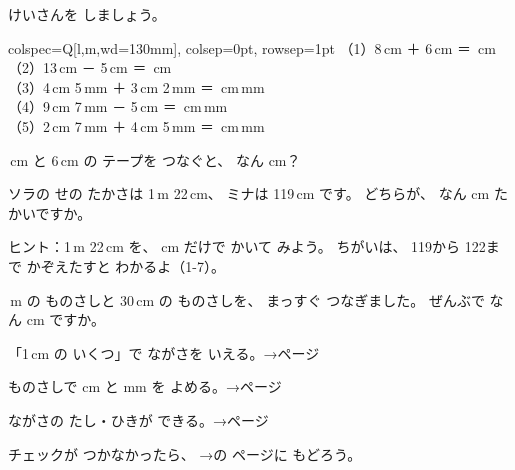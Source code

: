\bkproblem けいさんを しましょう。
\par
\noindent\hspace*{1\zw}\begin{tblr}{colspec={Q[l,m,wd=130mm]}, colsep=0pt, rowsep=1pt}
（1）8\,cm ＋ 6\,cm ＝ \bkkakikomi[13mm]\,cm \\
（2）13\,cm － 5\,cm ＝ \bkkakikomi[13mm]\,cm \\
（3）4\,cm 5\,mm ＋ 3\,cm 2\,mm ＝ \bkkakikomi\,cm\enspace\bkkakikomi\,mm \\
（4）9\,cm 7\,mm － 5\,cm ＝ \bkkakikomi\,cm\enspace\bkkakikomi\,mm \\
（5）2\,cm 7\,mm ＋ 4\,cm 5\,mm ＝ \bkkakikomi\,cm\enspace\bkkakikomi\,mm \\
\end{tblr}

\,cm と 6\,cm の テープを つなぐと、 なん cm？
\bkshikiran
{}


\bkproblem ソラの せの たかさは 1\,m 22\,cm、 ミナは 119\,cm です。 どちらが、 なん cm たかいですか。\par
{\small\color{bkOrange!58!black}ヒント：1\,m 22\,cm を、 cm だけで かいて みよう。 ちがいは、 119から 122まで かぞえたすと わかるよ（1-7）。}
\bkshikiran[11\zw]

\,m の ものさしと 30\,cm の ものさしを、 まっすぐ つなぎました。 ぜんぶで なん cm ですか。
\bkshikiran
{}

\begin{furikaeri}
\begin{checklist}
\item 「1\,cm の いくつ」で ながさを いえる。\hfill{\footnotesize\sffamily\color{bkTheme}→\pageref{bk:1-8:cm}ページ}
\item ものさしで cm と mm を よめる。\hfill{\footnotesize\sffamily\color{bkTheme}→\pageref{bk:1-8:yomu}ページ}
\item ながさの たし・ひきが できる。\hfill{\footnotesize\sffamily\color{bkTheme}→\pageref{bk:1-8:keisan}ページ}
\end{checklist}
チェックが つかなかったら、 →の ページに もどろう。
\end{furikaeri}
\clearpage
